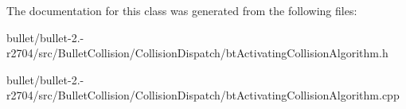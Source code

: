 The documentation for this class was generated from the following files\+:\begin{DoxyCompactItemize}
\item 
bullet/bullet-\/2.-\/r2704/src/\+Bullet\+Collision/\+Collision\+Dispatch/bt\+Activating\+Collision\+Algorithm.\+h\item 
bullet/bullet-\/2.-\/r2704/src/\+Bullet\+Collision/\+Collision\+Dispatch/bt\+Activating\+Collision\+Algorithm.\+cpp\end{DoxyCompactItemize}
